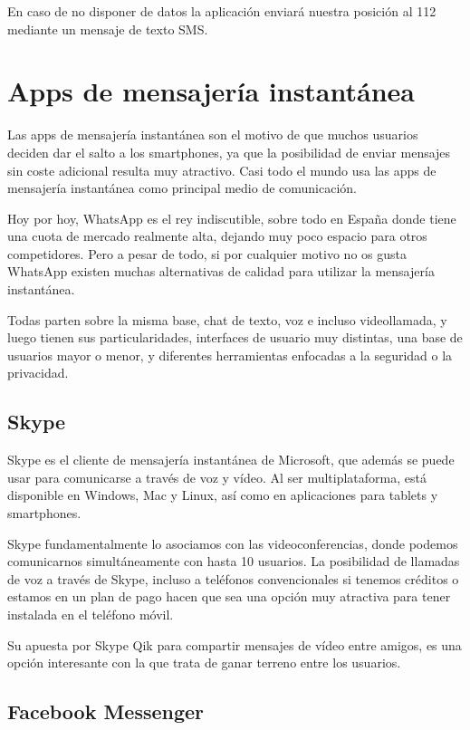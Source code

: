 En caso de no disponer de datos la aplicación enviará nuestra posición al 112 mediante un mensaje de texto SMS.

\clearpage

\section{Apps de mensajería instantánea}

Las apps de mensajería instantánea son el motivo de que muchos usuarios deciden dar el salto a los smartphones, ya que la posibilidad de enviar mensajes sin coste adicional resulta muy atractivo. Casi todo el mundo usa las apps de mensajería instantánea como principal medio de comunicación.

Hoy por hoy, WhatsApp es el rey indiscutible, sobre todo en España donde tiene una cuota de mercado realmente alta, dejando muy poco espacio para otros competidores. Pero a pesar de todo, si por cualquier motivo no os gusta WhatsApp existen muchas alternativas de calidad para utilizar la mensajería instantánea.

Todas parten sobre la misma base, chat de texto, voz e incluso videollamada, y luego tienen sus particularidades, interfaces de usuario muy distintas, una base de usuarios mayor o menor, y diferentes herramientas enfocadas a la seguridad o la privacidad.

\subsection{Skype}

Skype es el cliente de mensajería instantánea de Microsoft, que además se puede usar para comunicarse a través de voz y vídeo. Al ser multiplataforma, está disponible en Windows, Mac y Linux, así como en aplicaciones para tablets y smartphones.

Skype fundamentalmente lo asociamos con las videoconferencias, donde podemos comunicarnos simultáneamente con hasta 10 usuarios.  La posibilidad de llamadas de voz a través de Skype, incluso a teléfonos convencionales si tenemos créditos o estamos en un plan de pago hacen que sea una opción muy atractiva para tener instalada en el teléfono móvil.

Su apuesta por Skype Qik para compartir mensajes de vídeo entre amigos, es una opción interesante con la que trata de ganar terreno entre los usuarios.

\subsection{Facebook Messenger}

